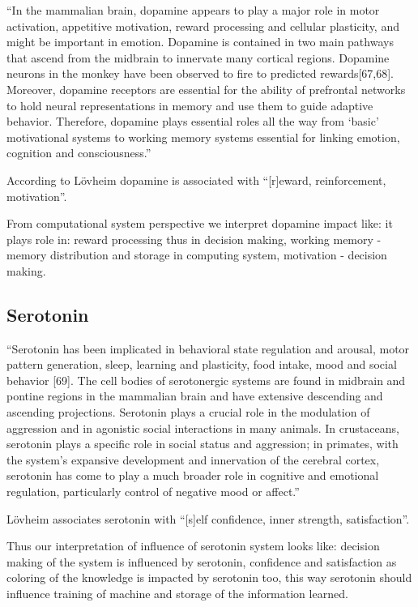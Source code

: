 ``In the mammalian brain, dopamine appears to play a major role in motor activation, appetitive motivation, reward processing and cellular plasticity, and might be important in emotion. Dopamine is contained in two main pathways that ascend from the midbrain to innervate many cortical regions. Dopamine neurons in the monkey have been observed to fire to predicted rewards[67,68]. Moreover, dopamine receptors are essential for the ability of prefrontal networks to hold neural representations in memory and use them to guide adaptive behavior. Therefore, dopamine plays essential roles all the way from ‘basic’ motivational systems to working memory systems essential for linking emotion, cognition and consciousness.''

According to L\"{o}vheim \cite{cubeofemotions} dopamine is associated with ``[r]eward, reinforcement, motivation''.

From computational system perspective we interpret dopamine impact like: it plays role in: reward processing thus in decision making, working memory - memory distribution and storage in computing system, motivation - decision making.

\subsection{Serotonin}

``Serotonin has been implicated in behavioral state regulation and arousal, motor pattern generation, sleep, learning and plasticity, food intake, mood and social behavior [69]. The cell bodies of serotonergic systems are found in midbrain and pontine regions in the mammalian brain and have extensive descending and ascending projections. Serotonin plays a crucial role in the modulation of aggression and in agonistic social interactions in many animals. In crustaceans, serotonin plays a specific role in social status and aggression; in primates, with the system’s expansive development and innervation of the cerebral cortex, serotonin has come to play a much broader role in cognitive and emotional regulation, particularly control of negative mood or affect.''

L\"{o}vheim associates serotonin with ``[s]elf confidence, inner strength, satisfaction''.

Thus our interpretation of influence of serotonin system looks like: decision making of the system is influenced by serotonin, confidence and satisfaction as coloring of the knowledge is impacted by serotonin too, this way serotonin should influence training of machine and storage of the information learned.

